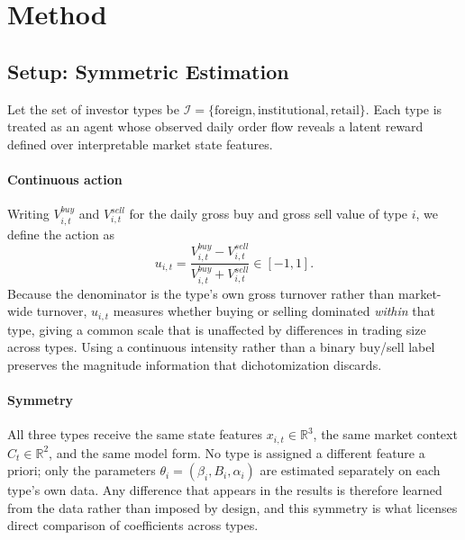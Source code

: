 %

\section{Method}
\label{sec:method}

\subsection{Setup: Symmetric Estimation}
\label{sec:setup}

Let the set of investor types be
$\mathcal{I}=\{\text{foreign},\text{institutional},\text{retail}\}$. Each type is
treated as an agent whose observed daily order flow reveals a latent reward
defined over interpretable market state features.

\paragraph{Continuous action}
Writing $V^{buy}_{i,t}$ and $V^{sell}_{i,t}$ for the daily gross buy and gross
sell value of type $i$, we define the action as
\begin{equation}
u_{i,t}=\frac{V^{buy}_{i,t}-V^{sell}_{i,t}}
             {V^{buy}_{i,t}+V^{sell}_{i,t}}\in[-1,1].
\label{eq:action}
\end{equation}
Because the denominator is the type's own gross turnover rather than
market-wide turnover, $u_{i,t}$ measures whether buying or selling dominated
\emph{within} that type, giving a common scale that is unaffected by
differences in trading size across types. Using a continuous intensity rather
than a binary buy/sell label preserves the magnitude information that
dichotomization discards.

\paragraph{Symmetry}
All three types receive the same state features $x_{i,t}\in\mathbb{R}^{3}$, the
same market context $C_t\in\mathbb{R}^{2}$, and the same model form. No type is
assigned a different feature a priori; only the parameters
$\theta_i=(\beta_i,B_i,\alpha_i)$ are estimated separately on each type's own
data. Any difference that appears in the results is therefore learned from the
data rather than imposed by design, and this symmetry is what licenses direct
comparison of coefficients across types.

